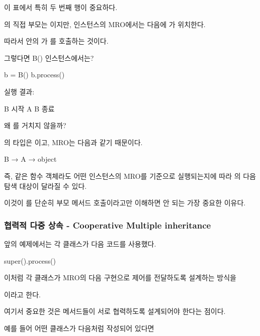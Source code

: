 이 표에서 특히 두 번째 행이 중요하다.

의 직접 부모는 이지만,  인스턴스의 MRO에서는  다음에 가 위치한다.

따라서  안의 가 를 호출하는 것이다.

\begin{dhknote}
\begin{dhksmry}[centered]
그렇다면 B() 인스턴스에서는?
\end{dhksmry}
\end{dhknote}

\begin{dhkcode}
b = B()
b.process()
\end{dhkcode}

실행 결과:

\begin{dhkzsh}
B 시작
A
B 종료
\end{dhkzsh}

왜 를 거치지 않을까?

의 타입은 이고, MRO는 다음과 같기 때문이다.

\begin{dhkzsh}
B → A → object
\end{dhkzsh}

즉, 같은  함수 객체라도 어떤 인스턴스의 MRO를 기준으로 실행되는지에 따라 의 다음 탐색 대상이 달라질 수 있다.

이것이 를 단순히 부모 메서드 호출이라고만 이해하면 안 되는 가장 중요한 이유다.

\subsubsection{협력적 다중 상속 - Cooperative Multiple inheritance}

앞의 예제에서는 각 클래스가 다음 코드를 사용했다.

\begin{dhkcode}
super().process()
\end{dhkcode}

이처럼 각 클래스가 MRO의 다음 구현으로 제어를 전달하도록 설계하는 방식을

이라고 한다.

여기서 중요한 것은 메서드들이 서로 협력하도록 설계되어야 한다는 점이다.

예를 들어 어떤 클래스가 다음처럼 작성되어 있다면

